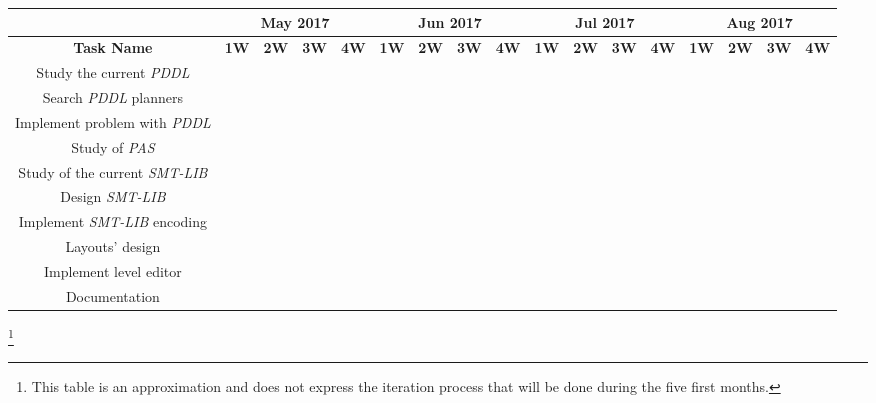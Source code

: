 \documentclass{report}
\theoremstyle{plain}
\begin{document}
\begin{landscape}
\vspace{1\baselineskip}

\begin{tabular}{c|c|c|c|c|c|c|c|c|c|c|c|c|c|c|c|c||}
    \cline{2-17}
    & \multicolumn{4}{||c|}{\textbf{May 2017}} & \multicolumn{4}{c|}{\textbf{Jun 2017}} & \multicolumn{4}{c|}{\textbf{Jul 2017}} & \multicolumn{4}{c||}{\textbf{Aug 2017}} \\
    \hline
    \multicolumn{1}{||c|}{\textbf{Task Name}} & \textbf{1W} & \textbf{2W} & \textbf{3W} & \textbf{4W} & \textbf{1W} & \textbf{2W} & \textbf{3W} & \textbf{4W} & \textbf{1W} & \textbf{2W} & \textbf{3W} & \textbf{4W} & \textbf{1W} & \textbf{2W} & \textbf{3W} & \textbf{4W} \\
    \hline\hline
    \multicolumn{1}{||c|}{Study the current \emph{PDDL}} & & & & & & & & & & & & & & & & \\
    \hline
    \multicolumn{1}{||c|}{Search \emph{PDDL} planners} & & & & & & & & & & & & & & & & \\
    \hline
    \multicolumn{1}{||c|}{Implement problem with \emph{PDDL}} & & & & & & & & & & & & & & & & \\
    \hline
    \multicolumn{1}{||c|}{Study of \emph{PAS}} & & & & & & & & & & & & & & & & \\
    \hline
    \multicolumn{1}{||c|}{Study of the current \emph{SMT-LIB}} & & & & & & & & & & & & & & & & \\
    \hline
    \multicolumn{1}{||c|}{Design \emph{SMT-LIB}} & \cellcolor{F} & \cellcolor{F} & \cellcolor{F} & \cellcolor{F} & & & & & & & & & & & & \\
    \hline
    \multicolumn{1}{||c|}{Implement \emph{SMT-LIB} encoding} & & & & & \cellcolor{F} & & & & & & & & & & & \\
    \hline
    \multicolumn{1}{||c|}{Layouts' design} & & & & & & \cellcolor{F} & & & & & & & & & & \\
    \hline
    \multicolumn{1}{||c|}{ Implement level editor} & & & & & & & & & & & \cellcolor{F} & \cellcolor{F} & & & & \\
    \hline
    \multicolumn{1}{||c|}{Documentation} & & & & & & & & & & & & & \cellcolor{F} & \cellcolor{F} & \cellcolor{F} & \cellcolor{F} \\
    \hline
\end{tabular}
\footnote{This table is an approximation and does not express the iteration process that will be done during the five first months.}

\end{landscape}
\end{document}
